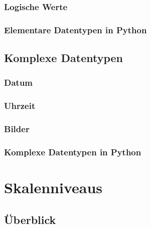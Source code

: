 \documentclass[
  oneside]{book}
\begin{document}
\hypertarget{logische-werte}{%
\subsubsection{Logische Werte}\label{logische-werte}}

\hypertarget{elementare-datentypen-in-python}{%
\subsubsection{Elementare Datentypen in Python}\label{elementare-datentypen-in-python}}

\hypertarget{komplexe-datentypen}{%
\subsection{Komplexe Datentypen}\label{komplexe-datentypen}}

\hypertarget{datum}{%
\subsubsection{Datum}\label{datum}}

\hypertarget{uhrzeit}{%
\subsubsection{Uhrzeit}\label{uhrzeit}}

\hypertarget{bilder}{%
\subsubsection{Bilder}\label{bilder}}

\hypertarget{komplexe-datentypen-in-python}{%
\subsubsection{Komplexe Datentypen in Python}\label{komplexe-datentypen-in-python}}

\hypertarget{skalenniveaus}{%
\section{Skalenniveaus}\label{skalenniveaus}}

\hypertarget{uxfcberblick}{%
\subsection{Überblick}\label{uxfcberblick}}
\end{document}
